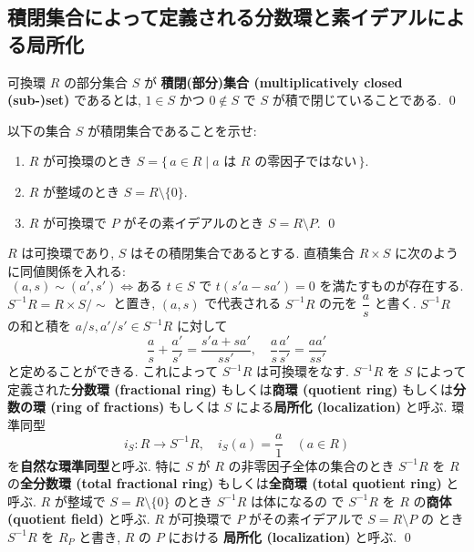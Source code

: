 \documentclass[12pt,twoside]{jarticle}
\begin{document}

\subsection{積閉集合によって定義される分数環と素イデアルによる局所化}

\begin{definition}[積閉集合]
 可換環 $R$ の部分集合 $S$ が
 {\bf 積閉(部分)集合 (multiplicatively closed (sub-)set)} であるとは, 
 $1\in S$ かつ $0\not\in S$ で $S$ が積で閉じていることである.
 \qed
\end{definition}

\begin{question}
 以下の集合 $S$ が積閉集合であることを示せ:
 \begin{enumerate}
 \item $R$ が可換環のとき %
  $S=\{\, a\in R \mid\text{$a$ は $R$ の零因子ではない}\,\}$.
 \item $R$ が整域のとき $S=R\setminus\{0\}$. 
 \item $R$ が可換環で $P$ がその素イデアルのとき $S=R\setminus P$.
 \qed
 \end{enumerate}
\end{question}

\begin{definition}
 $R$ は可換環であり, $S$ はその積閉集合であるとする.
 直積集合 $R\times S$ に次のように同値関係を入れる:
 \begin{equation*}
  (a,s)\sim (a',s')
  \iff
  \text{ある $t\in S$ で $t(s'a-sa')=0$ を満たすものが存在する}.
 \end{equation*}
 $S^{-1}R=R\times S/{\sim}$ と置き, %
 $(a,s)$ で代表される $S^{-1}R$ の元を $\dfrac{a}{s}$ と書く.
 $S^{-1}R$ の和と積を $a/s, a'/s'\in S^{-1}R$ に対して
 \begin{equation*}
  \frac{a}{s}+\frac{a'}{s'}=
  \frac{s'a+sa'}{ss'},
  \quad
  \frac{a}{s}\frac{a'}{s'}=
  \frac{aa'}{ss'}
 \end{equation*}
 と定めることができる. これによって $S^{-1}R$ は可換環をなす.
 $S^{-1}R$ を %
 $S$ によって定義された{\bf 分数環 (fractional ring)} 
 もしくは{\bf 商環 (quotient ring)} 
 もしくは{\bf 分数の環 (ring of fractions)} 
 もしくは $S$ による{\bf 局所化 (localization)} と呼ぶ.
 環準同型 
 \begin{equation*}
  i_S:R\to S^{-1}R, \quad i_S(a)=\dfrac{a}{1} \quad (a\in R) 
 \end{equation*}
 を{\bf 自然な環準同型}と呼ぶ.
 特に $S$ が $R$ の非零因子全体の集合のとき $S^{-1}R$ 
 を $R$ の{\bf 全分数環 (total fractional ring)} 
 もしくは{\bf 全商環 (total quotient ring)} と呼ぶ.
 $R$ が整域で $S=R\setminus\{0\}$ のとき $S^{-1}R$ は体になるの
 で $S^{-1}R$ を $R$ の{\bf 商体 (quotient field)} と呼ぶ.
 $R$ が可換環で $P$ がその素イデアルで $S=R\setminus P$ の
 とき $S^{-1}R$ を $R_P$ と書き, $R$ の $P$ における
 {\bf 局所化 (localization)} と呼ぶ.
 \qed
\end{definition}
\end{document}
